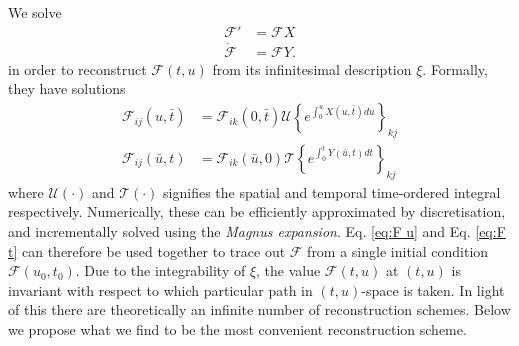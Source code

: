 \documentclass[withindex,glossary,techreport]{cam-thesis}
\begin{document}
\begin{appendices}
We solve
\begin{subequations} 
\begin{align}
\mathcal{F}' & =  \mathcal{F}X \label{eq:F u} \\
\dot{\mathcal{F}} & = \mathcal{F} \label{eq:F t} Y.
\end{align}
\end{subequations}
in order to reconstruct $\mathcal{F}(t,u)$ from its infinitesimal description $\xi$. Formally, they have solutions
\begin{subequations} 
\begin{align}
\mathcal{F}_{ij}(u, \bar{t}) & = \mathcal{F}_{ik}(0, \bar{t}) \mathscr{U} \left\{ e^{ \int_0^u X(u, \bar{t}) du } \right\}_{kj} \\
\mathcal{F}_{ij}(\bar{u}, t) & = \mathcal{F}_{ik}(\bar{u}, 0) \mathscr{T} \left\{ e^{ \int_0^t Y(\bar{u}, t) dt } \right\}_{kj}
\end{align}
\end{subequations}
where $\mathscr{U}(\cdot)$ and $\mathscr{T}(\cdot)$ signifies the spatial and temporal time-ordered integral respectively. Numerically, these can be efficiently approximated by discretisation, and incrementally solved using the \textit{Magnus expansion}. Eq. \ref{eq:F u} and Eq. \ref{eq:F t}
can therefore be used together to trace out $\mathcal{F}$
from a single initial condition $\mathcal{F}(u_{0}, t_{0})$. Due to
the integrability of $\xi$, the value $\mathcal{F}(t, u)$ at $(t, u)$ is invariant with respect to which particular path
in $(t, u)$-space is taken. In light of this there are theoretically
an infinite number of reconstruction schemes. Below we propose what
we find to be the most convenient reconstruction scheme.


\end{appendices}
\end{document}
